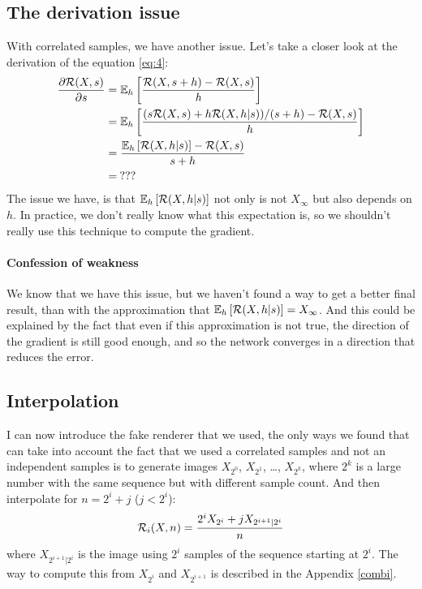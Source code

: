 \documentclass{classeENS}
\begin{document}
\subsection{The derivation issue}

With correlated samples, we have another issue.
Let's take a closer look at the derivation of the equation \ref{eq:4}:
\begin{align*}
    \label{eq:4}
 \frac{\partial \mathcal R(X,s)}{\partial s} & = \mathbb E_h \left [\frac{\mathcal R(X,s+h) - \mathcal R(X,s)}{h} \right ] \\
    & = \mathbb E_h \left [\frac{(s\mathcal R(X,s) + h\mathcal R(X,h | s))/(s+h) - \mathcal R(X,s)}{h}\right ] \\
    & = \frac{\mathbb E_h \left [\mathcal R(X,h | s) \right ] - \mathcal R(X,s)}{s+h} \\
    & =\:???
\end{align*}
The issue we have, is that $\mathbb E_h \left [\mathcal R(X,h | s) \right ]$ not only is not $X_\infty$ 
but also depends on $h$. In practice, we don't really know what this expectation is, so we 
shouldn't really use this technique to compute the gradient.

\paragraph*{Confession of weakness} We know that we have this issue, but we haven't found 
a way to get a better final result, than with the approximation that 
$\mathbb E_h \left [\mathcal R(X,h | s) \right ] = X_\infty$. And this could be explained by the fact that 
even if this approximation is not true, the direction of the gradient is still good 
enough, and so the network converges in a direction that reduces the error.

\subsection{Interpolation}

I can now introduce the fake renderer that we used, the only ways we found that can
take into account the fact that we used a correlated samples and not an independent samples
is to generate images $X_{2^0}$, $X_{2^1}$, \dots, $X_{2^k}$, where $2^k$ is a large number
with the same sequence but with different sample count. And then interpolate for 
$n = 2^i + j$ ($j < 2^i$):
\begin{equation}
    \label{eq:5}
    \mathcal R_i(X,n) = \frac{2^i X_{2^i} + j X_{2^{i+1} | 2^i}}{n}
\end{equation}
where $X_{2^{i+1} | 2^i}$ is the image using $2^i$ samples of the sequence starting at 
$2^i$. The way to compute this from $X_{2^i}$ and $X_{2^{i+1}}$ is described in the Appendix \ref{combi}.
\end{document}
